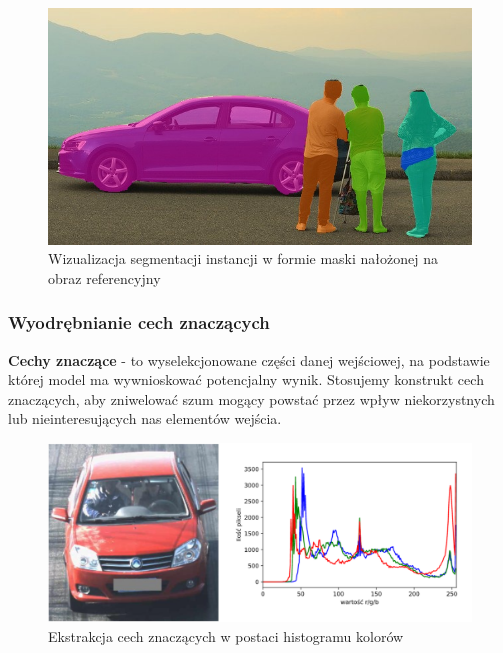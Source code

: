 \begin{description}
    \begin{figure}[h!]
    \begin{center}
        \includegraphics[scale=0.5]{img/car_people_ins.jpg}        
    \end{center}
    \caption{Wizualizacja segmentacji instancji w formie maski nałożonej na obraz referencyjny}
    \label{fig:seg_ins}
    \end{figure}
    
\end{description}

\pagebreak

\subsubsection{Wyodrębnianie cech znaczących}

\textbf{Cechy znaczące} - to wyselekcjonowane części danej wejściowej, na podstawie której model ma wywnioskować potencjalny wynik. Stosujemy konstrukt cech znaczących, aby zniwelować szum mogący powstać przez wpływ niekorzystnych lub nieinteresujących nas elementów wejścia.\\

\begin{figure}[h!]
    \begin{center}
        \includegraphics[scale=0.6]{img/feature_extraction.png}        
    \end{center}
    \caption{Ekstrakcja cech znaczących w postaci histogramu kolorów}
    \label{fig:ekstrakcja}
\end{figure}

